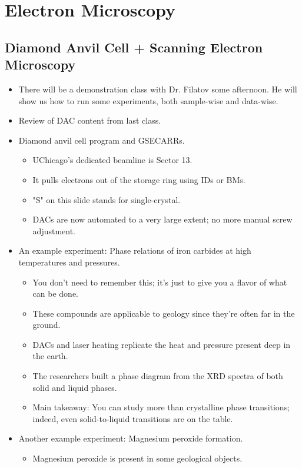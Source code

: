 \documentclass[../notes.tex]{subfiles}
\begin{document}
\chapter{Electron Microscopy}
\section{Diamond Anvil Cell + Scanning Electron Microscopy}
\begin{itemize}
    \item {}There will be a demonstration class with Dr. Filatov some afternoon. He will show us how to run some experiments, both sample-wise and data-wise.
    \item Review of DAC content from last class.
    \item Diamond anvil cell program and GSECARRs.
    \begin{itemize}
        \item UChicago's dedicated beamline is Sector 13.
        \item It pulls electrons out of the storage ring using IDs or BMs.
        \item "S" on this slide stands for single-crystal.
        \item DACs are now automated to a very large extent; no more manual screw adjustment.
    \end{itemize}
    \item An example experiment: Phase relations of iron carbides at high temperatures and pressures.
    \begin{itemize}
        \item You don't need to remember this; it's just to give you a flavor of what can be done.
        \item These compounds are applicable to geology since they're often far in the ground.
        \item DACs and laser heating replicate the heat and pressure present deep in the earth.
        \item The researchers built a phase diagram from the XRD spectra of both solid and liquid phases.
        \item Main takeaway: You can study more than crystalline phase transitions; indeed, even solid-to-liquid transitions are on the table.
    \end{itemize}
    \item Another example experiment: Magnesium peroxide formation.
    \begin{itemize}
        \item Magnesium peroxide is present in some geological objects.

\end{itemize}
\end{itemize}
\end{document}
